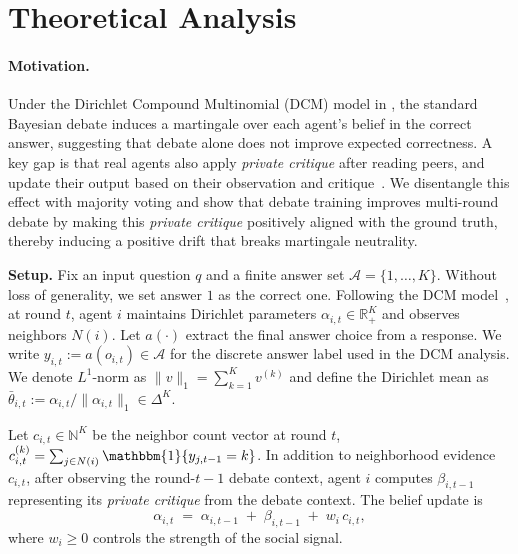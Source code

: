 \section{Theoretical Analysis}
\label{theoretical}

\paragraph{Motivation.}
Under the Dirichlet Compound Multinomial (DCM) model in \cite{choi2025debate}, the standard Bayesian debate induces a martingale over each agent's belief in the correct answer, suggesting that debate alone does not improve expected correctness.
A key gap is that real agents also apply \emph{private critique} after reading peers, and update their output based on their observation and critique~\cite{gou2023critic}.
We disentangle this effect with majority voting and show that
debate training improves multi-round debate by making this \emph{private critique} positively aligned with the ground truth,
thereby inducing a positive drift that breaks martingale neutrality.

\textbf{Setup.}
Fix an input question \(q\) and a finite answer set \(\mathcal{A}=\{1,\dots,K\}\). Without loss of generality, we set answer \(1\) as the correct one.
Following the DCM model~\cite{choi2025debate}, at round \(t\), agent \(i\) maintains Dirichlet parameters \(\alpha_{i,t}\in\mathbb{R}^K_{+}\) and observes neighbors \(N(i)\). Let $a(\cdot)$ extract the final answer choice from a response. We write $y_{i,t} := a(o_{i,t}) \in \mathcal{A}$ for the discrete answer label used in the DCM analysis.
We denote $L^1$-norm as \(\|v\|_1=\sum_{k=1}^K v^{(k)}\) and define the Dirichlet mean as \(\bar\theta_{i,t}:=\alpha_{i,t}/\|\alpha_{i,t}\|_1\in\Delta^{K}\).

\begin{definition}
\label{def:critique_update}
Let \(c_{i,t}\in\mathbb{N}^K\) be the neighbor count vector at round \(t\), 
\(c^{(k)}_{i,t}=\sum_{j\in N(i)}\mathbbm{1}\{y_{j,t-1}=k\}\).
In addition to neighborhood evidence \(c_{i,t}\), after observing the round-$t-1$ debate context, agent $i$ computes $\beta_{i,t-1}$
representing its \emph{private critique} from the debate context.
The belief update is
\begin{equation}
\alpha_{i,t} \;=\; \alpha_{i,t-1} \;+\; \beta_{i,t-1} \;+\; w_i\, c_{i,t},
\label{eq:update}
\end{equation}
where \(w_i\ge 0\) controls the strength of the social signal.
\end{definition}

